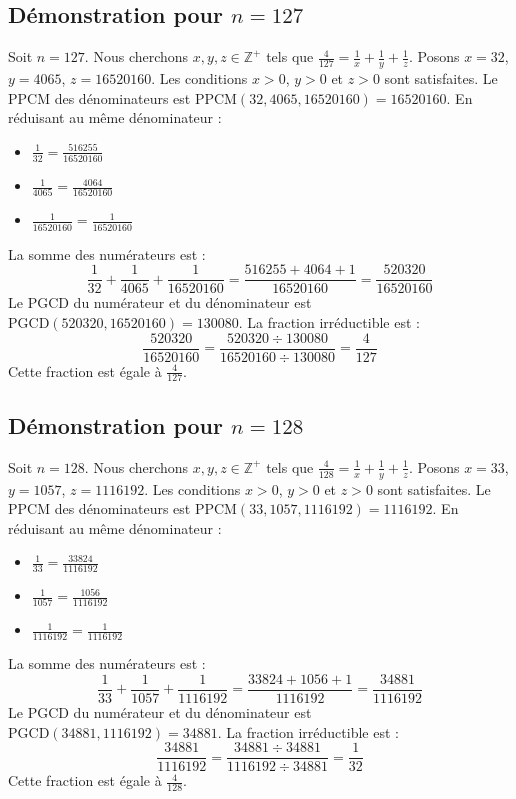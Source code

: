 \documentclass[11pt,a4paper]{article}
\begin{document}
\subsection{Démonstration pour $n = 127$}
Soit $n = 127$. Nous cherchons $x, y, z \in \mathbb{Z}^{+}$ tels que $\frac{4}{127} = \frac{1}{x} + \frac{1}{y} + \frac{1}{z}$.
Posons $x = 32$, $y = 4065$, $z = 16520160$.
Les conditions $x > 0$, $y > 0$ et $z > 0$ sont satisfaites.
Le PPCM des dénominateurs est $\text{PPCM}(32, 4065, 16520160) = 16520160$.
En réduisant au même dénominateur :
\begin{itemize}
    \item $\frac{1}{32} = \frac{516255}{16520160}$
    \item $\frac{1}{4065} = \frac{4064}{16520160}$
    \item $\frac{1}{16520160} = \frac{1}{16520160}$
\end{itemize}
La somme des numérateurs est :
$$ \frac{1}{32} + \frac{1}{4065} + \frac{1}{16520160} = \frac{516255 + 4064 + 1}{16520160} = \frac{520320}{16520160} $$
Le PGCD du numérateur et du dénominateur est $\text{PGCD}(520320, 16520160) = 130080$.
La fraction irréductible est :
$$ \frac{520320}{16520160} = \frac{520320 \div 130080}{16520160 \div 130080} = \frac{4}{127} $$
Cette fraction est égale à $\frac{4}{127}$.

\subsection{Démonstration pour $n = 128$}
Soit $n = 128$. Nous cherchons $x, y, z \in \mathbb{Z}^{+}$ tels que $\frac{4}{128} = \frac{1}{x} + \frac{1}{y} + \frac{1}{z}$.
Posons $x = 33$, $y = 1057$, $z = 1116192$.
Les conditions $x > 0$, $y > 0$ et $z > 0$ sont satisfaites.
Le PPCM des dénominateurs est $\text{PPCM}(33, 1057, 1116192) = 1116192$.
En réduisant au même dénominateur :
\begin{itemize}
    \item $\frac{1}{33} = \frac{33824}{1116192}$
    \item $\frac{1}{1057} = \frac{1056}{1116192}$
    \item $\frac{1}{1116192} = \frac{1}{1116192}$
\end{itemize}
La somme des numérateurs est :
$$ \frac{1}{33} + \frac{1}{1057} + \frac{1}{1116192} = \frac{33824 + 1056 + 1}{1116192} = \frac{34881}{1116192} $$
Le PGCD du numérateur et du dénominateur est $\text{PGCD}(34881, 1116192) = 34881$.
La fraction irréductible est :
$$ \frac{34881}{1116192} = \frac{34881 \div 34881}{1116192 \div 34881} = \frac{1}{32} $$
Cette fraction est égale à $\frac{4}{128}$.
\end{document}
